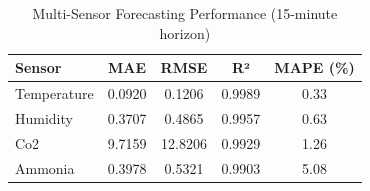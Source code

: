 \begin{table}[h]
\centering
\caption{Multi-Sensor Forecasting Performance (15-minute horizon)}
\label{tab:forecasting}
\begin{tabular}{lcccc}
\hline
\textbf{Sensor} & \textbf{MAE} & \textbf{RMSE} & \textbf{R²} & \textbf{MAPE (\%)} \\
\hline
Temperature & 0.0920 & 0.1206 & 0.9989 & 0.33 \\
Humidity & 0.3707 & 0.4865 & 0.9957 & 0.63 \\
Co2 & 9.7159 & 12.8206 & 0.9929 & 1.26 \\
Ammonia & 0.3978 & 0.5321 & 0.9903 & 5.08 \\
\hline
\end{tabular}
\end{table}